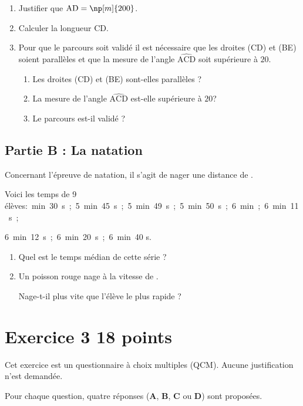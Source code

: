 \documentclass[11pt]{article}
\begin{document}
	\begin{enumerate}
		\item Justifier que $\mathrm{AD} = \np[m]{200}$.
		\item Calculer la longueur CD.
		\item Pour que le parcours soit validé il est nécessaire que les droites (CD) et (BE) soient parallèles et que la mesure de l'angle $\widehat{\mathrm{ACD}}$ soit supérieure à $20$\degres.
		\begin{enumerate}
			\item Les droites (CD) et (BE) sont-elles parallèles ?
			\item La mesure de l'angle $\widehat{\mathrm{ACD}}$ est-elle supérieure à $20$\degres ?
			\item Le parcours est-il validé ?
		\end{enumerate}
	\end{enumerate}

\subsection*{Partie B : La natation}

Concernant l'épreuve de natation, il s'agit de nager une distance de .

Voici les temps de 9 élèves:~min~30~s~;~5~min~45~s~;~5~min~49~s~;~5~min~50~s~;~6~min~;~6~min~11~s~;

6~min~12~s~;~6~min~20~s~;~6~min~40 s.

\begin{enumerate}[resume*]
\item Quel est le temps médian de cette série ?

\item Un poisson rouge nage à la vitesse de .

Nage-t-il plus vite que l'élève le plus rapide ?
\end{enumerate}

\section*{Exercice 3 \hfill 18 points}

Cet exercice est un questionnaire à choix multiples (QCM). Aucune justification n'est demandée.

Pour chaque question, quatre réponses (\textbf{A}, \textbf{B}, \textbf{C} ou \textbf{D}) sont proposées.
\end{document}
